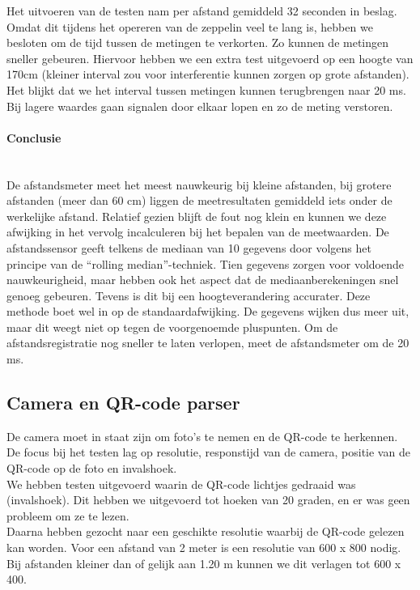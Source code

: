 \documentclass[eind]{penoverslag}
\begin{document}
Het uitvoeren van de testen nam per afstand gemiddeld 32 seconden in beslag. Omdat dit tijdens het opereren van de zeppelin veel te lang is, hebben we besloten om de tijd tussen de metingen te verkorten. Zo kunnen de metingen sneller gebeuren. Hiervoor hebben we een extra test uitgevoerd op een hoogte van 170cm (kleiner interval zou voor interferentie kunnen zorgen op grote afstanden). Het blijkt dat we het interval tussen metingen kunnen terugbrengen naar 20 ms. Bij lagere waardes gaan signalen door elkaar lopen en zo de meting verstoren. \\

\paragraph{Conclusie} ~\\ 
De afstandsmeter meet het meest nauwkeurig bij kleine afstanden, bij grotere afstanden (meer dan 60 cm) liggen de meetresultaten gemiddeld iets onder de werkelijke afstand. Relatief gezien blijft de fout nog klein en kunnen we deze afwijking in het vervolg incalculeren bij het bepalen van de meetwaarden. De afstandssensor geeft telkens de mediaan van 10 gegevens door volgens het principe van de “rolling median”-techniek. Tien gegevens zorgen voor voldoende nauwkeurigheid, maar hebben ook het aspect dat de mediaanberekeningen snel genoeg gebeuren. Tevens is dit bij een hoogteverandering accurater. Deze methode boet wel in op de standaardafwijking. De gegevens wijken dus meer uit, maar dit weegt niet op tegen de voorgenoemde pluspunten. Om de afstandsregistratie nog sneller te laten verlopen, meet de afstandsmeter om de 20 ms.

\subsection{Camera en QR-code parser}
De camera moet in staat zijn om foto's te nemen en de QR-code te herkennen. De focus bij het testen lag op resolutie, responstijd van de camera, positie van de QR-code op de foto en invalshoek. \\

We hebben testen uitgevoerd waarin de QR-code lichtjes gedraaid was (invalshoek). Dit hebben we uitgevoerd tot hoeken van 20 graden, en er was geen probleem om ze te lezen. \\

Daarna hebben gezocht naar een geschikte resolutie waarbij de QR-code gelezen kan worden. Voor een afstand van 2 meter is een resolutie van 600 x 800 nodig. Bij afstanden kleiner dan of gelijk aan 1.20 m kunnen we dit verlagen tot 600 x 400. \\
\end{document}
